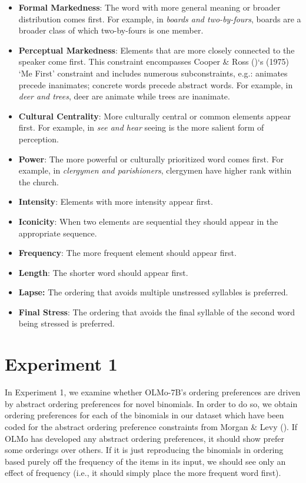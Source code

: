 \documentclass[
  nottoc]{article}
\begin{document}
\begin{itemize}
\item
  \textbf{Formal Markedness}: The word with more general meaning or
  broader distribution comes first. For example, in \emph{boards and
  two-by-fours}, boards are a broader class of which two-by-fours is one
  member.
\item
  \textbf{Perceptual Markedness}: Elements that are more closely
  connected to the speaker come first. This constraint encompasses
  Cooper \& Ross ()`s (1975) `Me
  First' constraint and includes numerous subconstraints, e.g.: animates
  precede inanimates; concrete words precede abstract words. For
  example, in \emph{deer and trees}, deer are animate while trees are
  inanimate.
\item
  \textbf{Cultural Centrality}: More culturally central or common
  elements appear first. For example, in \emph{see and hear} seeing is
  the more salient form of perception.
\item
  \textbf{Power}: The more powerful or culturally prioritized word comes
  first. For example, in \emph{clergymen and parishioners}, clergymen
  have higher rank within the church.
\item
  \textbf{Intensity}: Elements with more intensity appear first.
\item
  \textbf{Iconicity}: When two elements are sequential they should
  appear in the appropriate sequence.
\item
  \textbf{Frequency}: The more frequent element should appear first.
\item
  \textbf{Length}: The shorter word should appear first.
\item
  \textbf{Lapse:} The ordering that avoids multiple unstressed syllables
  is preferred.
\item
  \textbf{Final Stress}: The ordering that avoids the final syllable of
  the second word being stressed is preferred.
\end{itemize}

\section{Experiment 1}\label{experiment-1}

In Experiment 1, we examine whether OLMo-7B's ordering preferences are
driven by abstract ordering preferences for novel binomials. In order to
do so, we obtain ordering preferences for each of the binomials in our
dataset which have been coded for the abstract ordering preference
constraints from Morgan \& Levy
(). If OLMo has
developed any abstract ordering preferences, it should show prefer some
orderings over others. If it is just reproducing the binomials in
ordering based purely off the frequency of the items in its input, we
should see only an effect of frequency (i.e., it should simply place the
more frequent word first).
\end{document}
